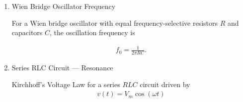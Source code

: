 \begin{enumerate}[label=\thesubsection.\arabic*,ref=\thesubsection.\theenumi]
\begin{enumerate}
\begin{align}
\frac{V_1-V_A}{R_1}+\frac{V_2-V_A}{R_2}+\frac{V_3-V_A}{R_3}
=\frac{V_A-V_{\text{out}}}{R_f}.
\end{align}

Substituting $V_A=0$:

\begin{align}
\frac{V_1}{R_1}+\frac{V_2}{R_2}+\frac{V_3}{R_3}
=\frac{-V_{\text{out}}}{R_f}.
\end{align}

Solving for $V_{\text{out}}$:

\begin{align}
V_{\text{out}}
&=-R_f\left(\frac{V_1}{R_1}+\frac{V_2}{R_2}+\frac{V_3}{R_3}\right)\\
&=-\left(\frac{R_f}{R_1}V_1+\frac{R_f}{R_2}V_2+\frac{R_f}{R_3}V_3\right),
\end{align}


\begin{align}
V_{\text{out}}=-\sum_{i}\frac{R_f}{R_i}V_i.
\end{align}
\end{enumerate}

\begin{align}
V_{\text{out}}=-\left(\frac{R_f}{R_1}V_1+\frac{R_f}{R_2}V_2+\frac{R_f}{R_3}V_3+\cdots\right), \label{amplifier}
\end{align}

valid provided $V_{\text{out}}$ stays within the saturation limits,

\begin{align}
-V_{\text{sat}}\le V_{\text{out}}\le +V_{\text{sat}}.
\end{align}

\item Wien Bridge Oscillator Frequency

For a Wien bridge oscillator with equal frequency-selective resistors
$R$ and capacitors $C$, the oscillation frequency is

\begin{align}
f_0=\frac{1}{2\pi RC}. \label{wien}
\end{align}

\item Series RLC Circuit --- Resonance \label{resonance}

Kirchhoff's Voltage Law for a series $RLC$ circuit driven by
\begin{align}
v(t)=V_m\cos(\omega t)
\end{align}


\end{enumerate}
